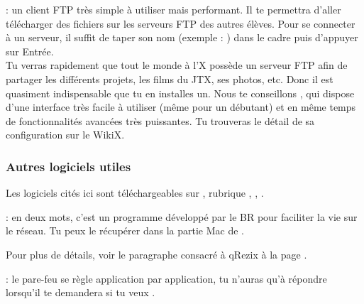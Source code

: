   : un client FTP très simple à utiliser mais performant. Il te permettra d'aller télécharger des fichiers sur les serveurs FTP des autres élèves.
Pour se connecter à un serveur, il suffit de taper son nom (exemple : ) dans le cadre  puis d'appuyer sur Entrée.\\
Tu verras rapidement que tout le monde à l'X possède un serveur FTP afin de partager les différents projets, les films du JTX, ses photos, etc. Donc il est quasiment indispensable que tu en installes un. Nous te conseillons , qui dispose d'une interface très facile à utiliser (même pour un débutant) et en même temps de fonctionnalités avancées très puissantes. Tu trouveras le détail de sa configuration sur le WikiX.

\subsubsection{Autres logiciels utiles}

Les logiciels cités ici sont téléchargeables sur , rubrique , , .

 \noindent{} : en deux mots, c'est un programme développé par le BR pour faciliter la vie sur le réseau. Tu peux le récupérer dans la partie Mac de \xshare.

\noindent Pour plus de détails, voir le paragraphe consacré à qRezix à la page \pageref{qrezix}.

\noindent {} : le pare-feu se règle application par application, tu n'auras qu'à répondre  lorsqu'il te demandera si tu veux .




